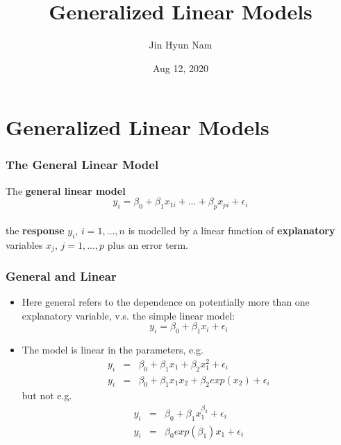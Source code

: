 \documentclass[10pt,xcolor={svgnames},t]{beamer}
\title[Generalized Linear Models] %
{Generalized Linear Models}
\subtitle{}
\author[Jin Hyun Nam]{Jin Hyun Nam }													%
\institute[] 															%
{}													%
\date[Aug 12, 2020]
 {Aug 12, 2020}														%
{}
\begin{document}
%
\begin{frame}
  \titlepage

\end{frame}
%

\section{Generalized Linear Models}
%
%
\begin{frame}
	\frametitle{The General Linear Model}
	
	\bigskip
	\begin{block}{The \textbf{general linear model}}
		\bigskip
		\begin{displaymath}
		y_i = \beta_0 + \beta_1 x_{1i} + \ldots + \beta_p x_{pi} + \epsilon_i
		\end{displaymath}
		\\
		the \textbf{response} $y_i$, $i=1,\ldots ,n$ is modelled by a linear function of \textbf{explanatory} variables $x_j$, $j=1 , \ldots , p$ plus an error term.
	\end{block}
	\bigskip
	
	
\end{frame}
%
\begin{frame}
	\frametitle{General and Linear}
	
	\begin{itemize}
		\item Here general refers to the dependence on potentially more than one explanatory variable, v.s. the simple linear model:
		\[
		y_i = \beta_0 + \beta_1 x_i + \epsilon_i
		\]
		
		\item The model is linear in the parameters, e.g.
		\begin{eqnarray*}
			y_i &=& \beta_0 + \beta_1 x_1 + \beta_2 x_1^2 + \epsilon_i \\
			y_i&=&\beta_0 + \beta_1 x_1x_2 + \beta_2 exp(x_2) +\epsilon_i
		\end{eqnarray*}
		but not e.g.
		\begin{eqnarray*}
			y_i &=& \beta_0 + \beta_1 x_1^{ \beta_2}+ \epsilon_i \\
			y_i&=&\beta_0 exp(\beta_1 )x_1 +\epsilon_i
		\end{eqnarray*}
	\end{itemize}
	
	
\end{frame}
%
\end{document}
